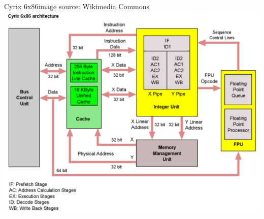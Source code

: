 \documentclass[mathserif,xcolor={dvipsnames,table}]{beamer}
\begin{document}
\begin{frame}{Cyrix 6x86\hfill\tiny{image source: Wikimedia Commons}}
\includegraphics[width=\textwidth]{images/6x86.pdf}
\end{frame}
\end{document}
